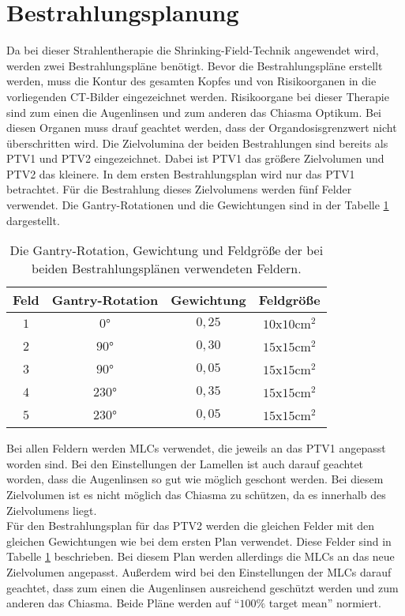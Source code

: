 \section{Bestrahlungsplanung}
\label{sec:Bestrahlungsplanung}

Da bei dieser Strahlentherapie die Shrinking-Field-Technik angewendet wird, werden zwei
Bestrahlungspläne benötigt.
Bevor die Bestrahlungspläne erstellt werden, muss die Kontur des gesamten Kopfes und von
Risikoorganen in die vorliegenden CT-Bilder eingezeichnet werden. Risikoorgane bei dieser
Therapie sind zum einen die Augenlinsen und zum anderen das Chiasma Optikum. Bei diesen
Organen muss drauf geachtet werden, dass der Organdosisgrenzwert nicht überschritten wird.
Die Zielvolumina der beiden Bestrahlungen sind bereits als PTV1 und PTV2 eingezeichnet. Dabei
ist PTV1 das größere Zielvolumen und PTV2 das kleinere.
In dem ersten Bestrahlungsplan wird nur das PTV1 betrachtet. Für die Bestrahlung dieses Zielvolumens werden
fünf Felder verwendet. Die Gantry-Rotationen und die Gewichtungen sind in der Tabelle \ref{tab:Felder1} dargestellt.

\begin{table}
  \centering
  \caption{Die Gantry-Rotation, Gewichtung und Feldgröße der bei beiden Bestrahlungsplänen verwendeten Feldern.}
  \label{tab:Felder1}
  \begin{tabular}{c c c c}
    \toprule
    Feld & Gantry-Rotation & Gewichtung & Feldgröße\\
    \midrule
    $1$ & $0°$ & $0,25$ & $10$x$10 \si{\centi\meter\squared}$ \\
    $2$ & $90°$ & $0,30$ & $15$x$15 \si{\centi\meter\squared}$ \\
    $3$ & $90°$ & $0,05$ & $15$x$15 \si{\centi\meter\squared}$ \\
    $4$ & $230°$ & $0,35$ & $15$x$15 \si{\centi\meter\squared}$ \\
    $5$ & $230°$ & $0,05$ & $15$x$15 \si{\centi\meter\squared}$ \\
    \bottomrule
  \end{tabular}
\end{table}

Bei allen Feldern werden MLCs verwendet, die jeweils an das PTV1 angepasst worden sind.
Bei den Einstellungen der Lamellen ist auch darauf geachtet worden, dass die Augenlinsen
so gut wie möglich geschont werden. Bei diesem Zielvolumen ist es nicht möglich das Chiasma
zu schützen, da es innerhalb des Zielvolumens liegt. \\
Für den Bestrahlungsplan für das PTV2 werden die gleichen Felder mit den gleichen
Gewichtungen wie bei dem ersten Plan verwendet. Diese Felder sind in Tabelle \ref{tab:Felder1} beschrieben.
Bei diesem Plan werden allerdings die MLCs an das neue Zielvolumen angepasst. Außerdem
wird bei den Einstellungen der MLCs darauf geachtet, dass zum einen die Augenlinsen ausreichend geschützt
werden und zum anderen das Chiasma. Beide Pläne werden auf \enquote{$100\%$ target mean} normiert.

